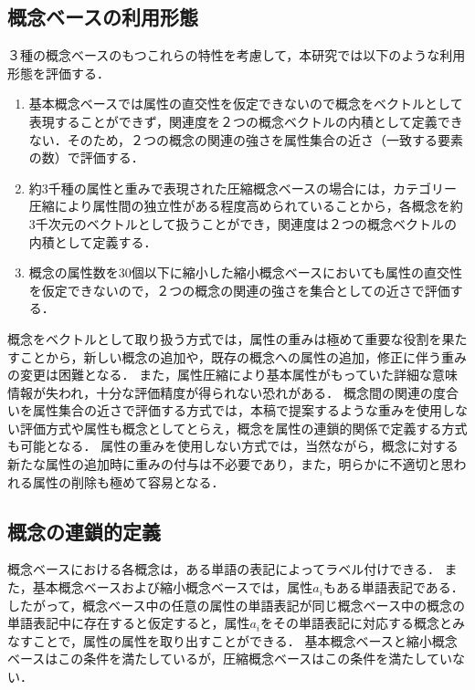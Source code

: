 \subsection{概念ベースの利用形態} \label{DefCon}

３種の概念ベースのもつこれらの特性を考慮して，本研究では以下のような利用形態を評価する．
\begin{enumerate}
	\item  基本概念ベースでは属性の直交性を仮定できないので概念をベクトルとして表現することができず，関連度を２つの概念ベクトルの内積として定義できない．そのため，２つの概念の関連の強さを属性集合の近さ（一致する要素の数）で評価する．
	\item  約3千種の属性と重みで表現された圧縮概念ベースの場合には，カテゴリー圧縮により属性間の独立性がある程度高められていることから，各概念を約3千次元のベクトルとして扱うことができ，関連度は２つの概念ベクトルの内積として定義する．
	\item  概念の属性数を30個以下に縮小した縮小概念ベースにおいても属性の直交性を仮定できないので，２つの概念の関連の強さを集合としての近さで評価する．
\end{enumerate}

概念をベクトルとして取り扱う方式では，属性の重みは極めて重要な役割を果たすことから，新しい概念の追加や，既存の概念への属性の追加，修正に伴う重みの変更は困難となる．
また，属性圧縮により基本属性がもっていた詳細な意味情報が失われ，十分な評価精度が得られない恐れがある．
概念間の関連の度合いを属性集合の近さで評価する方式では，本稿で提案するような重みを使用しない評価方式や属性も概念としてとらえ，概念を属性の連鎖的関係で定義する方式も可能となる．
属性の重みを使用しない方式では，当然ながら，概念に対する新たな属性の追加時に重みの付与は不必要であり，また，明らかに不適切と思われる属性の削除も極めて容易となる．


\subsection{概念の連鎖的定義} \label{CBchain}

概念ベースにおける各概念は，ある単語の表記によってラベル付けできる．
また，基本概念ベースおよび縮小概念ベースでは，属性$a_i$もある単語表記である．
したがって，概念ベース中の任意の属性の単語表記が同じ概念ベース中の概念の単語表記中に存在すると仮定すると，属性$a_i$をその単語表記に対応する概念とみなすことで，属性の属性を取り出すことができる．
基本概念ベースと縮小概念ベースはこの条件を満たしているが，圧縮概念ベースはこの条件を満たしていない．

